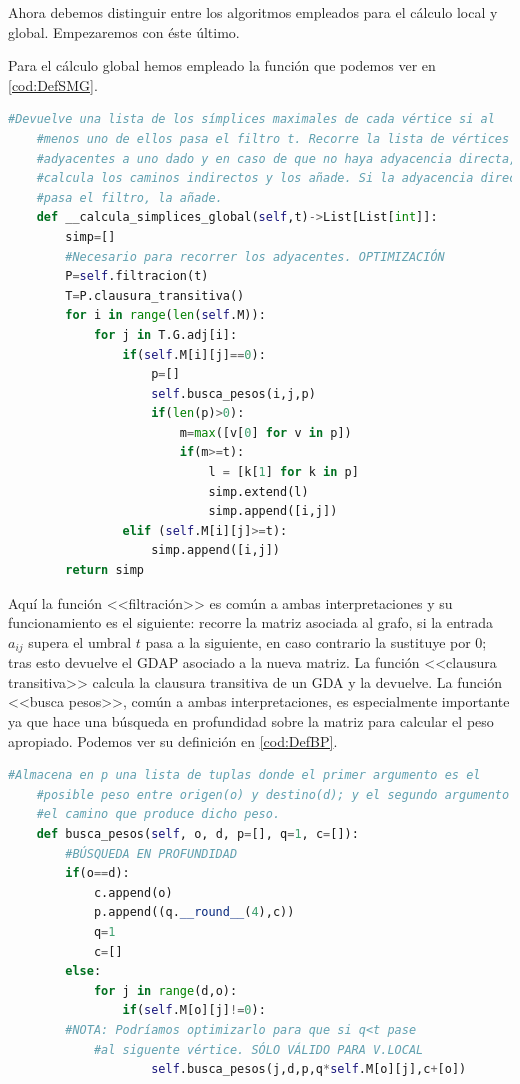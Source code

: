 \documentclass[12pt, a4paper, twoside]{book}
\numberwithin{equation}{section}
\theoremstyle{definition}
\theoremstyle{remark}
\theoremstyle{plain}
\begin{document}
	Ahora debemos distinguir entre los algoritmos empleados para el 
	cálculo local y global. Empezaremos con éste último.

	Para el cálculo global hemos empleado la función que podemos ver en 
	\autoref{cod:DefSMG}.

	\begin{lstlisting}[language=Python,float=htbp,caption=Función para el 
	cálculo de símplices maximales (global)., label=cod:DefSMG]
	#Devuelve una lista de los símplices maximales de cada vértice si al 
	#menos uno de ellos pasa el filtro t. Recorre la lista de vértices 
	#adyacentes a uno dado y en caso de que no haya adyacencia directa, 
	#calcula los caminos indirectos y los añade. Si la adyacencia directa 
	#pasa el filtro, la añade.
	def __calcula_simplices_global(self,t)->List[List[int]]:
        simp=[]
        #Necesario para recorrer los adyacentes. OPTIMIZACIÓN
        P=self.filtracion(t)
        T=P.clausura_transitiva()
        for i in range(len(self.M)):
            for j in T.G.adj[i]:
                if(self.M[i][j]==0):
                    p=[]
                    self.busca_pesos(i,j,p)
                    if(len(p)>0):
                        m=max([v[0] for v in p])
                        if(m>=t):
                            l = [k[1] for k in p]
                            simp.extend(l)
                            simp.append([i,j])
                elif (self.M[i][j]>=t):
                    simp.append([i,j])
        return simp
	\end{lstlisting}

	Aquí la función <<filtración>> es común a ambas 
	interpretaciones y su funcionamiento es el siguiente: recorre la 
	matriz asociada al grafo, si la entrada $a_{ij}$ supera el umbral $t$ 
	pasa a la siguiente, en caso contrario la sustituye por 0; tras esto 
	devuelve el GDAP asociado a la nueva matriz. La función 
	<<clausura transitiva>> calcula la clausura transitiva de un GDA y 
	la devuelve. La función <<busca pesos>>, común a ambas 
	interpretaciones, es especialmente importante ya 
	que hace una búsqueda en profundidad sobre la matriz para calcular el
	peso apropiado. Podemos ver su definición en \autoref{cod:DefBP}.

	\begin{lstlisting}[language=Python, float=htbp, caption= Función de 
	búsqueda de pesos., label=cod:DefBP]
	#Almacena en p una lista de tuplas donde el primer argumento es el 
	#posible peso entre origen(o) y destino(d); y el segundo argumento es 
	#el camino que produce dicho peso. 
	def busca_pesos(self, o, d, p=[], q=1, c=[]):
        #BÚSQUEDA EN PROFUNDIDAD
        if(o==d):
            c.append(o)
            p.append((q.__round__(4),c))
            q=1
            c=[]
        else:   
            for j in range(d,o):
                if(self.M[o][j]!=0):
        #NOTA: Podríamos optimizarlo para que si q<t pase 
		    #al siguente vértice. SÓLO VÁLIDO PARA V.LOCAL
                    self.busca_pesos(j,d,p,q*self.M[o][j],c+[o])
	\end{lstlisting}
\end{document}

